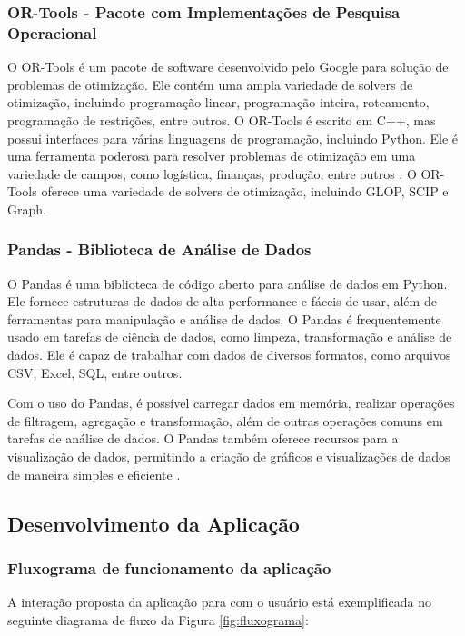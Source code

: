 \documentclass{article}
\begin{document}
\subsubsection{OR-Tools - Pacote com Implementações de Pesquisa Operacional}

O OR-Tools é um pacote de software desenvolvido pelo Google para solução de problemas de otimização. Ele contém uma ampla variedade de solvers de otimização, incluindo programação linear, programação inteira, roteamento, programação de restrições, entre outros. O OR-Tools é escrito em C++, mas possui interfaces para várias linguagens de programação, incluindo Python. Ele é uma ferramenta poderosa para resolver problemas de otimização em uma variedade de campos, como logística, finanças, produção, entre outros \cite{ortools}.
O OR-Tools oferece uma variedade de solvers de otimização, incluindo GLOP, SCIP e Graph.

\subsubsection{Pandas - Biblioteca de Análise de Dados}

O Pandas é uma biblioteca de código aberto para análise de dados em Python. Ele fornece estruturas de dados de alta performance e fáceis de usar, além de ferramentas para manipulação e análise de dados. O Pandas é frequentemente usado em tarefas de ciência de dados, como limpeza, transformação e análise de dados. Ele é capaz de trabalhar com dados de diversos formatos, como arquivos CSV, Excel, SQL, entre outros.

Com o uso do Pandas, é possível carregar dados em memória, realizar operações de filtragem, agregação e transformação, além de outras operações comuns em tarefas de análise de dados. O Pandas também oferece recursos para a visualização de dados, permitindo a criação de gráficos e visualizações de dados de maneira simples e eficiente \cite{pandas}.

\subsection{Desenvolvimento da Aplicação}
\subsubsection{Fluxograma de funcionamento da aplicação}
A interação proposta da aplicação para com o usuário está exemplificada no seguinte diagrama de fluxo da Figura \ref{fig:fluxograma}:
\end{document}
